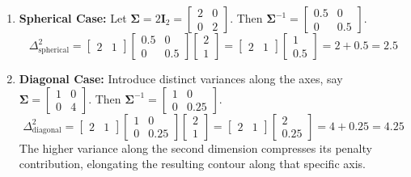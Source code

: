 \documentclass{article}
\begin{document}
\begin{enumerate}
    \item \textbf{Spherical Case:} Let $\boldsymbol{\Sigma} = 2\mathbf{I}_2 = \begin{bmatrix} 2 & 0 \\ 0 & 2 \end{bmatrix}$. Then $\boldsymbol{\Sigma}^{-1} = \begin{bmatrix} 0.5 & 0 \\ 0 & 0.5 \end{bmatrix}$.
    \begin{equation*}
    \Delta^2_{\text{spherical}} = \begin{bmatrix} 2 & 1 \end{bmatrix} \begin{bmatrix} 0.5 & 0 \\ 0 & 0.5 \end{bmatrix} \begin{bmatrix} 2 \\ 1 \end{bmatrix} = \begin{bmatrix} 2 & 1 \end{bmatrix} \begin{bmatrix} 1 \\ 0.5 \end{bmatrix} = 2 + 0.5 = \mathbf{2.5}
    \end{equation*}
    
    \item \textbf{Diagonal Case:} Introduce distinct variances along the axes, say $\boldsymbol{\Sigma} = \begin{bmatrix} 1 & 0 \\ 0 & 4 \end{bmatrix}$. Then $\boldsymbol{\Sigma}^{-1} = \begin{bmatrix} 1 & 0 \\ 0 & 0.25 \end{bmatrix}$.
    \begin{equation*}
    \Delta^2_{\text{diagonal}} = \begin{bmatrix} 2 & 1 \end{bmatrix} \begin{bmatrix} 1 & 0 \\ 0 & 0.25 \end{bmatrix} \begin{bmatrix} 2 \\ 1 \end{bmatrix} = \begin{bmatrix} 2 & 1 \end{bmatrix} \begin{bmatrix} 2 \\ 0.25 \end{bmatrix} = 4 + 0.25 = \mathbf{4.25}
    \end{equation*}
    The higher variance along the second dimension compresses its penalty contribution, elongating the resulting contour along that specific axis.
    

\end{enumerate}
\end{document}
